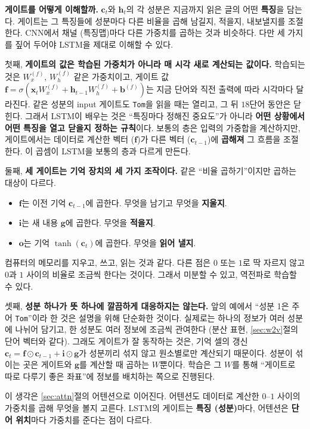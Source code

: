 \documentclass[11pt,a4paper]{article}
\newcommand{\vect}[1]{\bm{#1}}
\newcommand{\w}[1]{\texttt{#1}}
\begin{document}
\textbf{게이트를 어떻게 이해할까.} $\vect c_t$와 $\vect h_t$의 각 성분은 지금까지 읽은 글의 어떤 \textbf{특징}을 담는다. 게이트는 그 특징들에 성분마다 다른 비율을 곱해 남길지, 적을지, 내보낼지를 조절한다.
CNN에서 채널 (특징맵)마다 다른 가중치를 곱하는 것과 비슷하다. 다만 세 가지를 짚어 두어야 LSTM을 제대로 이해할 수 있다.

첫째, \textbf{게이트의 값은 학습된 가중치가 아니라 매 시각 새로 계산되는 값이다.}
학습되는 것은 $W_x^{(f)}$, $W_h^{(f)}$ 같은 가중치이고, 게이트 값 $\vect f=\sigma(\vect x_tW_x^{(f)}+\vect h_{t-1}W_h^{(f)}+\vect b^{(f)})$는 지금 단어와 직전 출력에 따라 시각마다 달라진다.
같은 성분의 input 게이트도 \w{Tom}을 읽을 때는 열리고, 그 뒤 $18$단어 동안은 닫힌다.
그래서 LSTM이 배우는 것은 ``특징마다 정해진 중요도''가 아니라 \textbf{어떤 상황에서 어떤 특징을 열고 닫을지 정하는 규칙}이다.
보통의 층은 입력의 가중합을 계산하지만, 게이트에서는 데이터로 계산한 벡터 ($\vect f$)가 다른 벡터 ($\vect c_{t-1}$)에 \textbf{곱해져} 그 흐름을 조절한다. 이 곱셈이 LSTM을 보통의 층과 다르게 만든다.

둘째, \textbf{세 게이트는 기억 장치의 세 가지 조작이다.} 같은 ``비율 곱하기''이지만 곱하는 대상이 다르다.
\begin{itemize}[leftmargin=1.5em]
\item $\vect f$는 이전 기억 $\vect c_{t-1}$에 곱한다. 무엇을 남기고 무엇을 \textbf{지울지}.
\item $\vect i$는 새 내용 $\vect g$에 곱한다. 무엇을 \textbf{적을지}.
\item $\vect o$는 기억 $\tanh(\vect c_t)$에 곱한다. 무엇을 \textbf{읽어 낼지}.
\end{itemize}
컴퓨터의 메모리를 지우고, 쓰고, 읽는 것과 같다. 다른 점은 $0$ 또는 $1$로 딱 자르지 않고 $0$과 $1$ 사이의 비율로 조금씩 한다는 것이다. 그래서 미분할 수 있고, 역전파로 학습할 수 있다.

셋째, \textbf{성분 하나가 뜻 하나에 깔끔하게 대응하지는 않는다.}
앞의 예에서 ``성분 1은 주어 \w{Tom}''이라 한 것은 설명을 위해 단순화한 것이다. 실제로는 하나의 정보가 여러 성분에 나뉘어 담기고, 한 성분도 여러 정보에 조금씩 관여한다 (분산 표현, \ref{sec:w2v}절의 단어 벡터와 같다).
그래도 게이트가 잘 동작하는 것은, 기억 셀의 갱신 $\vect c_t=\vect f\odot\vect c_{t-1}+\vect i\odot\vect g$가 성분끼리 섞지 않고 원소별로만 계산되기 때문이다.
성분이 섞이는 곳은 게이트와 $\vect g$를 계산할 때 곱하는 $W$뿐이다. 학습은 그 $W$를 통해 ``게이트로 따로 다루기 좋은 좌표''에 정보를 배치하는 쪽으로 진행된다.

이 생각은 \ref{sec:attn}절의 어텐션으로 이어진다. 어텐션도 데이터로 계산한 $0$--$1$ 사이의 가중치를 곱해 무엇을 볼지 고른다. LSTM의 게이트는 \textbf{특징 (성분)}마다, 어텐션은 \textbf{단어 위치}마다 가중치를 준다는 점이 다르다.
\end{document}
